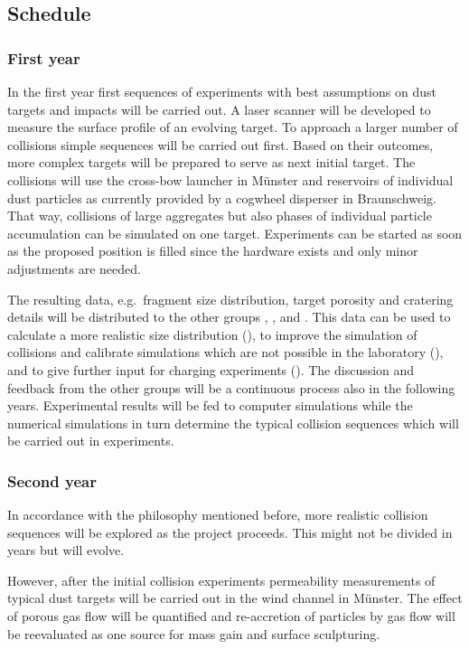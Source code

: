 \subsection{Schedule}
\subsubsection{First year}

In the first year first sequences of experiments with best assumptions on
dust targets and impacts will be carried out. A laser scanner will be
developed to measure the surface profile of an evolving target. To approach
a larger number of collisions simple sequences will be carried out
first. Based on their outcomes, more complex targets will be prepared to
serve as next initial target. The collisions will use the cross-bow launcher
in M\"unster and reservoirs of individual dust particles as currently
provided by a cogwheel disperser in Braunschweig. That way, collisions of
large aggregates but also phases of individual particle accumulation can be
simulated on one target. Experiments can be started as soon as the proposed
position is filled since the hardware exists and only minor adjustments are
needed.

The resulting data, e.g.\ fragment size distribution, target porosity and
cratering details will be distributed to the other groups \projblum{},
\projdul{}, and \projkley{}.  This data can be used to calculate a more
realistic size distribution (\projdul{}), to improve the simulation of
collisions and calibrate simulations which are not possible in the
laboratory (\projkley{}), and to give further input for charging experiments
(\projblum{}).  The discussion and feedback from the other groups will be a
continuous process also in the following years. Experimental results will be
fed to computer simulations while the numerical simulations in turn
determine the typical collision sequences which will be carried out in
experiments.


\subsubsection{Second year}

In accordance with the philosophy mentioned before, more realistic
collision sequences will be explored as the project proceeds. This
might not be divided in years but will evolve.

However, after the initial collision experiments permeability measurements of
typical dust targets will be carried out in the wind channel in
M\"unster. The effect of porous gas flow will be quantified and re-accretion
of particles by gas flow will be reevaluated as one source for mass gain and
surface sculpturing.

